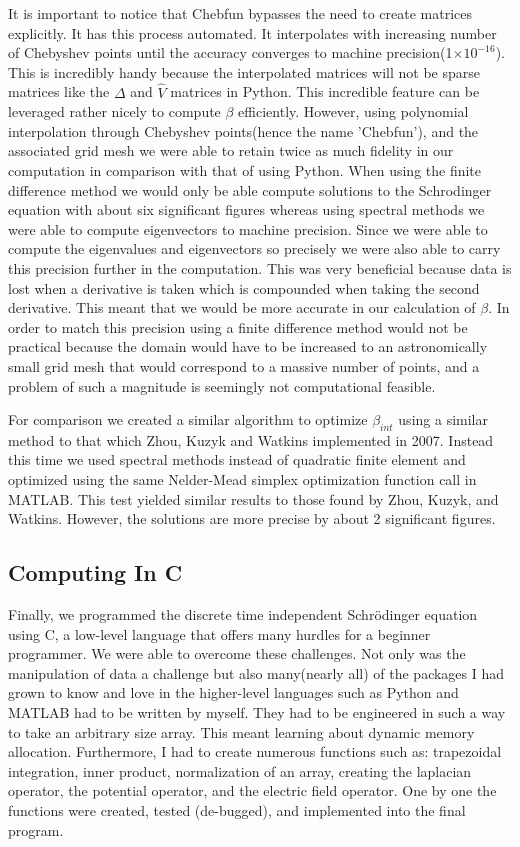 \documentclass{report}
\theoremstyle{definition}
\providecommand{\e}[1]{\ensuremath{\times 10^{#1}}}
\begin{document}
\bigskip


\noindent It is important to notice that Chebfun bypasses the need to create matrices explicitly. It has this process automated. It interpolates with increasing number of Chebyshev points until the accuracy converges to machine precision(1\e{-16}). This is incredibly handy because the interpolated matrices will not be sparse matrices like the $\Delta$ and $\hat{V}$ matrices in Python. This incredible feature can be leveraged rather nicely to compute $\beta$ efficiently. However, using polynomial interpolation through Chebyshev points(hence the name 'Chebfun'), and the associated grid mesh we were able to retain twice as much fidelity in our computation in comparison with that of using Python. When using the finite difference method we would only be able compute solutions to the Schrodinger equation with about six significant figures whereas using spectral methods we were able to compute eigenvectors to machine precision. Since we were able to compute the eigenvalues and eigenvectors so precisely we were also able to carry this precision further in the computation. This was very beneficial because data is lost when a derivative is taken which is compounded when taking the second derivative. This meant that we would be more accurate in our calculation of $\beta$. In order to match this precision using a finite difference method would not be practical because the domain would have to be increased to an astronomically small grid mesh that would correspond to a massive number of points, and a problem of such a magnitude is seemingly not computational feasible. 

For comparison we created a similar algorithm to optimize $\beta_{int}$ using a similar method to that which Zhou, Kuzyk and Watkins implemented in 2007.\cite{zhou2007} Instead this time we used spectral methods instead of quadratic finite element and optimized using the same Nelder-Mead simplex optimization function call in MATLAB. This test yielded similar results to those found by Zhou, Kuzyk, and Watkins. However, the solutions are more precise by about 2 significant figures. 

\subsection*{Computing In C}
Finally, we programmed the discrete time independent Schr\"odinger equation using C,  a low-level language that offers many hurdles for a beginner programmer. We were able to overcome these challenges. Not only was the manipulation of data a challenge but also many(nearly all) of the packages I had grown to know and love in the higher-level languages such as Python and MATLAB had to be written by myself. They had to be engineered in such a way to take an arbitrary size array. This meant learning about dynamic memory allocation. Furthermore, I had to create numerous functions such as: trapezoidal integration, inner product, normalization of an array, creating the laplacian operator, the potential operator, and the electric field operator. One by one the functions were created, tested (de-bugged), and implemented into the final program. 
\end{document}
